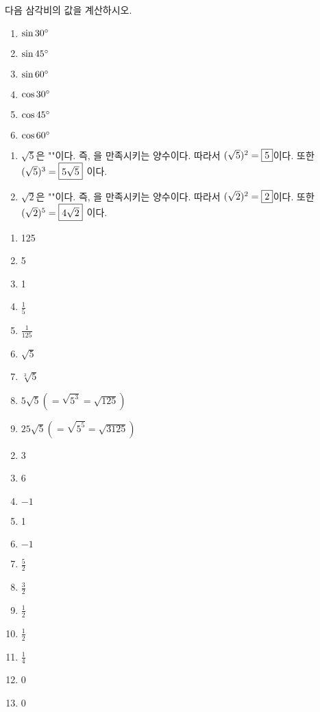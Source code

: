 \documentclass[a4paper]{oblivoir}
\begin{document}
%
\prob
다음 삼각비의 값을 계산하시오.
\begin{enumerate}[(1)]
\item
\(\sin 30\degree\)
\item
\(\sin 45\degree\)
\item
\(\sin 60\degree\)
\item
\(\cos 30\degree\)
\item
\(\cos 45\degree\)
\item
\(\cos 60\degree\)
\end{enumerate}

\newpage
\setcounter{num}{0}

%
\ans

\begin{enumerate}[(1)]
\item
\(\sqrt5\)은 ""이다.
즉, 을 만족시키는 양수이다.
따라서 \((\sqrt5)^2=\fbox{5}\)이다.
또한
\((\sqrt5)^3=\fbox{$5\sqrt5$}\)
이다.
\item
\(\sqrt2\)은 ""이다.
즉, 을 만족시키는 양수이다.
따라서 \((\sqrt2)^2=\fbox{2}\)이다.
또한
\((\sqrt2)^5=\fbox{$4\sqrt2$}\)
이다.
\end{enumerate}

%
\ans
\begin{enumerate}[(1)]
\item
125
\item
5
\item
1
\item
\(\frac15\)
\item
\(\frac1{125}\)
\item
\(\sqrt5\)
\item
\(\sqrt[3]5\)
\item
\(5\sqrt5(=\sqrt{5^3}=\sqrt{125})\)
\item
\(25\sqrt5(=\sqrt{5^5}=\sqrt{3125})\)
\end{enumerate}

%
\ans
\begin{enumerate}[(1)]
\setcounter{enumi}{1}
\item
3
\item
6
\item
\(-1\)
\item
1
\item
\(-1\)
\item
\(\frac52\)
\item
\(\frac32\)
\item
\(\frac12\)
\item
\(\frac12\)
\item
\(\frac14\)
\item
0
\item
0
\end{enumerate}
\end{document}
